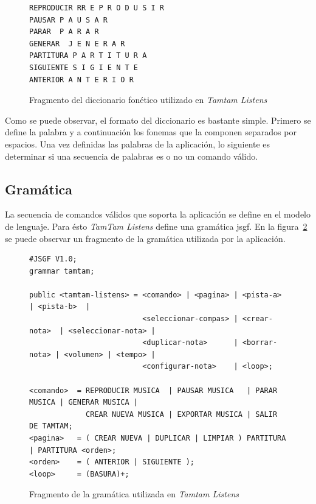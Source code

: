 \lstset{
  basicstyle=\scriptsize,        %
  breakatwhitespace=false,         %
  frame=single,                    %
  language=Octave,                 %
  numbersep=5pt,                   %
  showstringspaces=false,          %
  stepnumber=2,                    %
  tabsize=2                       %
}

\begin{figure}[H]
\begin{lstlisting}
REPRODUCIR RR E P R O D U S I R
PAUSAR P A U S A R
PARAR  P A R A R
GENERAR  J E N E R A R
PARTITURA P A R T I T U R A
SIGUIENTE S I G I E N T E
ANTERIOR A N T E R I O R
\end{lstlisting}
\caption{Fragmento del diccionario fon\'etico utilizado en \emph{Tamtam Listens}}
\label{figure:fragmento-dic}
\end{figure}

Como se puede observar, el formato del diccionario es bastante simple. Primero se define la palabra y 
a continuaci\'on los fonemas que la componen separados por espacios.
Una vez definidas las palabras de la aplicaci\'on, lo siguiente es determinar si una secuencia de palabras es o no un 
comando v\'alido.

\subsection{Gram\'atica}

La secuencia de comandos v\'alidos que soporta la aplicaci\'on se define en el modelo de lenguaje. Para \'esto
\emph{TamTam Listens} define una gram\'atica \gls{jsgf}. En la figura~\ref{figure:fragmento-gram} se puede observar
un fragmento de la gram\'atica utilizada por la aplicaci\'on.

\begin{figure}[H]
\begin{lstlisting}
#JSGF V1.0;
grammar tamtam;

public <tamtam-listens> = <comando> | <pagina> | <pista-a>     | <pista-b>  | 
                          <seleccionar-compas> | <crear-nota>  | <seleccionar-nota> | 
                          <duplicar-nota>      | <borrar-nota> | <volumen> | <tempo> | 
                          <configurar-nota>    | <loop>;

<comando>  = REPRODUCIR MUSICA  | PAUSAR MUSICA   | PARAR MUSICA | GENERAR MUSICA | 
             CREAR NUEVA MUSICA | EXPORTAR MUSICA | SALIR DE TAMTAM;
<pagina>   = ( CREAR NUEVA | DUPLICAR | LIMPIAR ) PARTITURA | PARTITURA <orden>;
<orden>    = ( ANTERIOR | SIGUIENTE );
<loop>     = (BASURA)+;
\end{lstlisting}
\caption{Fragmento de la gram\'atica utilizada en \emph{Tamtam Listens}}
\label{figure:fragmento-gram}
\end{figure} 

